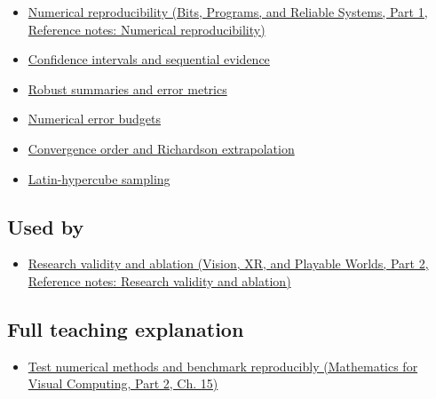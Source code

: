 \begin{itemize}
\tightlist
\item
  \href{../01-Bits-Programs-and-Reliable-Systems-P01/main.pdf\#appendix-5f1a2c3f97ff}{Numerical reproducibility (Bits, Programs, and Reliable Systems, Part 1, Reference notes: Numerical reproducibility)}
\item
  \hyperref[appendix-c83016554b1e]{Confidence intervals and sequential evidence}
\item
  \hyperref[appendix-bcc44e9d3d02]{Robust summaries and error metrics}
\item
  \hyperref[appendix-31b8c295e05f]{Numerical error budgets}
\item
  \hyperref[appendix-aca80b6bf17a]{Convergence order and Richardson extrapolation}
\item
  \hyperref[appendix-1c5e85693a06]{Latin-hypercube sampling}
\end{itemize}

\subsection{Used by}\label{appendix-b9db93e28371-used-by}

\hypertarget{appendix-b9db93e28371-used-by}{}

\begin{itemize}
\tightlist
\item
  \href{../07-Vision-XR-and-Playable-Worlds-P02/main.pdf\#appendix-65788587ef78}{Research validity and ablation (Vision, XR, and Playable Worlds, Part 2, Reference notes: Research validity and ablation)}
\end{itemize}

\subsection{Full teaching explanation}\label{appendix-b9db93e28371-full-teaching-explanation}

\hypertarget{appendix-b9db93e28371-full-teaching-explanation}{}

\begin{itemize}
\tightlist
\item
  \href{../02-Mathematics-for-Visual-Computing-P02/main.pdf\#02-foundations-ii-ch031-test-numerical-methods-and-benchmark-reproducibly}{Test numerical methods and benchmark reproducibly (Mathematics for Visual Computing, Part 2, Ch. 15)}
\end{itemize}


